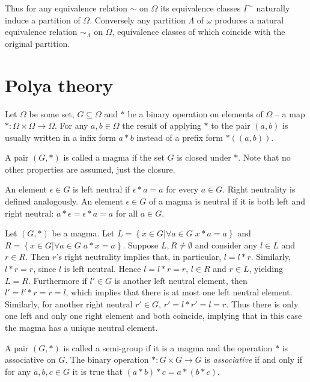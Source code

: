 \documentclass[a4paper]{article}
\newcommand{\obj}[1]{\left\{{#1}\right\}}
\newcommand{\brac}[1]{{\left({#1}\right)}}
\begin{document}
Thus for any equivalence relation $\sim$ on $\Omega$ its equivalence classes $\Gamma^\sim$ naturally induce a partition of $\Omega$. Conversely any partition $\Lambda$ of $\omega$ produces a natural equivalence relation $\sim_\Lambda$ on $\Omega$, equivalence classes of which coincide with the original partition.



\section{Polya theory} %
\label{sec:polya_theory}
Let $\Omega$ be some set, $G\subseteq \Omega$ and $\ast$ be a binary operation on elements of $\Omega$ -- a map $\ast:\Omega\times \Omega\to \Omega$. For any $a,b\in \Omega$ the result of applying $\ast$ to the pair $\brac{a,b}$ is usually written in a infix form $a\ast b$ instead of a prefix form $\ast\brac{(a,b)}$.

A pair $\brac{G, \ast}$ is called a magma if the set $G$ is closed under $\ast$. Note that no other properties are assumed, just the closure.

An element $\epsilon\in G$ is left neutral if $\epsilon\ast a = a$ for every $a\in G$. Right neutrality is defined analogously. An element $\epsilon\in G$ of a magma is neutral if it is both left and right neutral: $a\ast \epsilon = \epsilon\ast a = a$ for all $a\in G$.

Let $\brac{G,\ast}$ be a magma. Let $L=\obj{x\in G\vert \forall{a\in G}\; x\ast a = a}$ and $R=\obj{x\in G\vert \forall{a\in G}\; a\ast x = a}$. Suppose $L,R\neq \emptyset$ and consider any $l\in L$ and $r\in R$. Then $r$'s right neutrality implies that, in particular, $l = l\ast r$. Similarly, $l\ast r = r$, since $l$ is left neutral. Hence $l = l\ast r = r$, $l\in R$ and $r\in L$, yielding $L=R$. Furthermore if $l'\in G$ is another left neutral element, then $l' = l'\ast r = r = l$, which implies that there is at most one left neutral element. Similarly, for another right neutral $r'\in G$, $r' = l\ast r' = l = r$. Thus there is only one left and only one right element and both coincide, implying that in this case the magma has a unique neutral element.

A pair $\brac{G, \ast}$ is called a semi-group if it is a magma and the operation $\ast$ is associative on $G$. The binary operation $\ast:G\times G\to G$ is \emph{associative} if and only if for any $a, b, c\in G$ it is true that $\brac{a\ast b}\ast c = a\ast \brac{b\ast c}$.
\end{document}
